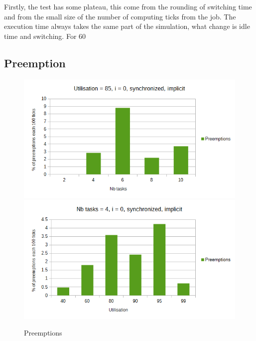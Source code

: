 \documentclass[a4paper,12pt]{article}
\begin{document}
Firstly, the test has some plateau, this come from the rounding of switching time and from the small size of the number of computing ticks from the job. The execution time always takes the same part of the simulation, what change is idle time and switching. For 60%

\subsection{Preemption}
\begin{figure}[H]
	\begin{center}
		\includegraphics[scale=0.49]{nbtaskspreemption.png}
		\includegraphics[scale=0.49]{utilisationpreemption.png}
	\end{center}
	\label{p}
	\caption{Preemptions}
\end{figure}
\end{document}
